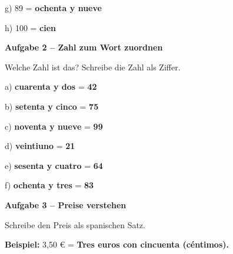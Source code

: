 \documentclass[11pt, a4paper]{article}
\newcommand{\fachfarbe}{spanisch}
\newcommand{\punktebox}[1]{\hfill\fbox{\small \_/#1}}
\newcommand{\lsg}[1]{\textcolor{loesung}{\textbf{#1}}}
\newenvironment{aufgabe}[1]{%
    \needspace{5\baselineskip}%
    \nopagebreak[4]%
    \vspace{10pt}
    \noindent\textbf{\textcolor{\fachfarbe}{Aufgabe #1}}
    \nopagebreak[4]%
    \vspace{5pt}
    \nopagebreak[4]%
    \begin{list}{}{\leftmargin=0pt}
    \item[]
}{%
    \end{list}
}
\newcommand{\es}[1]{\textcolor{\fachfarbe}{\textbf{#1}}}
\begin{document}
\vspace{0.8em}

\noindent
g) 89 = \lsg{ochenta y nueve}

\vspace{0.8em}

\noindent
h) 100 = \lsg{cien}

\vspace{15pt}


\begin{aufgabe}{2 -- Zahl zum Wort zuordnen}
Welche Zahl ist das? Schreibe die Zahl als Ziffer. \punktebox{6}
\end{aufgabe}

\noindent
a) \es{cuarenta y dos} = \lsg{42}

\vspace{0.8em}

\noindent
b) \es{setenta y cinco} = \lsg{75}

\vspace{0.8em}

\noindent
c) \es{noventa y nueve} = \lsg{99}

\vspace{0.8em}

\noindent
d) \es{veintiuno} = \lsg{21}

\vspace{0.8em}

\noindent
e) \es{sesenta y cuatro} = \lsg{64}

\vspace{0.8em}

\noindent
f) \es{ochenta y tres} = \lsg{83}

\vspace{15pt}


\begin{aufgabe}{3 -- Preise verstehen}
Schreibe den Preis als spanischen Satz. \punktebox{6}
\end{aufgabe}

\begin{hinweis}
\textbf{Beispiel:} 3,50 € = \es{Tres euros con cincuenta (céntimos).}
\end{hinweis}
\end{document}
